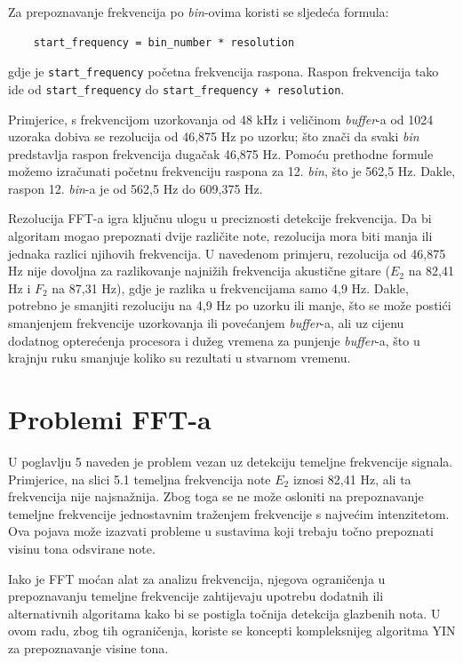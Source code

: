 \documentclass[times, utf8, diplomski, numeric]{fer}
\begin{document}
Za prepoznavanje frekvencija po \textit{bin}-ovima koristi se sljedeća formula:
\begin{verbatim}
	start_frequency = bin_number * resolution
\end{verbatim}
gdje je \verb|start_frequency| početna frekvencija raspona.\cite{gustine_2021} Raspon frekvencija tako ide od \verb|start_frequency| do \verb|start_frequency + resolution|.

Primjerice, s frekvencijom uzorkovanja od 48 kHz i veličinom \textit{buffer}-a od 1024 uzoraka dobiva se rezolucija od 46,875 Hz po uzorku; što znači da svaki \textit{bin} predstavlja raspon frekvencija dugačak 46,875 Hz. Pomoću prethodne formule možemo izračunati početnu frekvenciju raspona za 12. \textit{bin}, što je 562,5 Hz. Dakle, raspon 12. \textit{bin}-a je od 562,5 Hz do 609,375 Hz.

Rezolucija FFT-a igra ključnu ulogu u preciznosti detekcije frekvencija. Da bi algoritam mogao prepoznati dvije različite note, rezolucija mora biti manja ili jednaka razlici njihovih frekvencija. U navedenom primjeru, rezolucija od 46,875 Hz nije dovoljna za razlikovanje najnižih frekvencija akustične gitare ($E_2$ na 82,41 Hz i $F_2$ na 87,31 Hz), gdje je razlika u frekvencijama samo 4,9 Hz. Dakle, potrebno je smanjiti rezoluciju na 4,9 Hz po uzorku ili manje, što se može postići smanjenjem frekvencije uzorkovanja ili povećanjem \textit{buffer}-a, ali uz cijenu dodatnog opterećenja procesora i dužeg vremena za punjenje \textit{buffer}-a, što u krajnju ruku smanjuje koliko su rezultati u stvarnom vremenu.

\section{Problemi FFT-a}
U poglavlju 5 naveden je problem vezan uz detekciju temeljne frekvencije signala. Primjerice, na slici 5.1 temeljna frekvencija note $E_2$ iznosi 82,41 Hz, ali ta frekvencija nije najsnažnija. Zbog toga se ne može osloniti na prepoznavanje temeljne frekvencije jednostavnim traženjem frekvencije s najvećim intenzitetom. Ova pojava može izazvati probleme u sustavima koji trebaju točno prepoznati visinu tona odsvirane note.

Iako je FFT moćan alat za analizu frekvencija, njegova ograničenja u prepoznavanju temeljne frekvencije zahtijevaju upotrebu dodatnih ili alternativnih algoritama kako bi se postigla točnija detekcija glazbenih nota. U ovom radu, zbog tih ograničenja, koriste se koncepti kompleksnijeg algoritma YIN za prepoznavanje visine tona.
\end{document}
